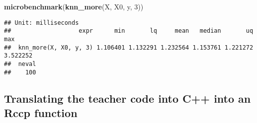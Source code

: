 \documentclass[]{article}
\newenvironment{Shaded}{\begin{snugshade}}{\end{snugshade}}
\newcommand{\DecValTok}[1]{\textcolor[rgb]{0.00,0.00,0.81}{#1}}
\newcommand{\KeywordTok}[1]{\textcolor[rgb]{0.13,0.29,0.53}{\textbf{#1}}}
\newcommand{\NormalTok}[1]{#1}
\begin{document}
\begin{Shaded}
\begin{Highlighting}[]
\KeywordTok{microbenchmark}\NormalTok{(}\KeywordTok{knn_more}\NormalTok{(X, X0, y, }\DecValTok{3}\NormalTok{))}
\end{Highlighting}
\end{Shaded}

\begin{verbatim}
## Unit: milliseconds
##                   expr      min       lq     mean   median       uq      max
##  knn_more(X, X0, y, 3) 1.106401 1.132291 1.232564 1.153761 1.221272 3.522252
##  neval
##    100
\end{verbatim}

\newpage

\hypertarget{translating-the-teacher-code-into-c-into-an-rccp-function}{%
\subsection{Translating the teacher code into C++ into an Rccp
function}\label{translating-the-teacher-code-into-c-into-an-rccp-function}}
\end{document}
